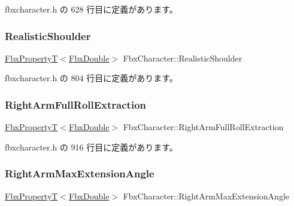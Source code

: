  fbxcharacter.\+h の 628 行目に定義があります。

\mbox{\label{class_fbx_character_a594b9348cd768b365f2fd7efce2370ba}} 
\subsubsection{\texorpdfstring{Realistic\+Shoulder}{RealisticShoulder}}
{\footnotesize\ttfamily \hyperlink{class_fbx_property_t}{Fbx\+PropertyT}$<$\hyperlink{fbxtypes_8h_a171e72a1c46fc15c1a6c9c31948c1c5b}{Fbx\+Double}$>$ Fbx\+Character\+::\+Realistic\+Shoulder}



 fbxcharacter.\+h の 804 行目に定義があります。

\mbox{\label{class_fbx_character_aa3de38aa03e69e153cad072cf63eb299}} 
\subsubsection{\texorpdfstring{Right\+Arm\+Full\+Roll\+Extraction}{RightArmFullRollExtraction}}
{\footnotesize\ttfamily \hyperlink{class_fbx_property_t}{Fbx\+PropertyT}$<$\hyperlink{fbxtypes_8h_a171e72a1c46fc15c1a6c9c31948c1c5b}{Fbx\+Double}$>$ Fbx\+Character\+::\+Right\+Arm\+Full\+Roll\+Extraction}



 fbxcharacter.\+h の 916 行目に定義があります。

\mbox{\label{class_fbx_character_a7de3b751867aaa9a994d93a4d209515a}} 
\subsubsection{\texorpdfstring{Right\+Arm\+Max\+Extension\+Angle}{RightArmMaxExtensionAngle}}
{\footnotesize\ttfamily \hyperlink{class_fbx_property_t}{Fbx\+PropertyT}$<$\hyperlink{fbxtypes_8h_a171e72a1c46fc15c1a6c9c31948c1c5b}{Fbx\+Double}$>$ Fbx\+Character\+::\+Right\+Arm\+Max\+Extension\+Angle}



